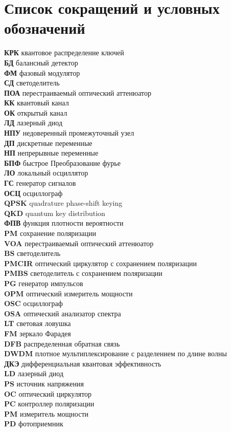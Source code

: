 \chapter*{Список сокращений и условных обозначений} %
\noindent
\textbf{КРК} квантовое распределение ключей \\
\textbf{БД} балансный детектор \\
\textbf{ФМ} фазовый модулятор\\
\textbf{СД} светоделитель\\
\textbf{ПОА} перестраиваемый оптический аттенюатор\\ 
\textbf{КК} квантовый канал\\ 
\textbf{ОК} открытый канал\\ 
\textbf{ЛД} лазерный диод\\ 
\textbf{НПУ} недоверенный промежуточный узел\\ 
\textbf{ДП} дискретные переменные\\ 
\textbf{НП} непрерывные переменные\\ 
\textbf{БПФ} быстрое Преобразование фурье\\ 
\textbf{ЛО} локальный осциллятор\\ 
\textbf{ГС} генератор сигналов\\ 
\textbf{ОСЦ} осциллограф\\ 
\textbf{QPSK} quadrature phase-shift keying\\ 
\textbf{QKD} quantum key distribution\\ 
\textbf{ФПВ} функция плотности вероятности\\ 
\textbf{PM} сохранение поляризации\\ 
\textbf{VOA} перестраиваемый оптический аттенюатор\\ 
\textbf{BS} светоделитель\\ 
\textbf{PMCIR} оптический циркулятор с сохранением поляризации\\ 
\textbf{PMBS} светоделитель с сохранением поляризации\\
\textbf{PG} генератор импульсов\\ 
\textbf{OPM} оптический измеритель мощности\\ 
\textbf{OSC} осциллограф\\ 
\textbf{OSA} оптический анализатор спектра\\ 
\textbf{LT} световая ловушка\\ 
\textbf{FM} зеркало Фарадея\\ 
\textbf{DFB} распределенная обратная связь\\ 
\textbf{DWDM} плотное мультиплексирование с разделением по длине волны\\ 
\textbf{ДКЭ} дифференциальная квантовая эффективность\\ 
\textbf{LD} лазерный диод\\ 
\textbf{PS} источник напряжения\\ 
\textbf{OC} оптический циркулятор\\ 
\textbf{PC} контроллер поляризации\\
\textbf{PM} измеритель мощности\\ 
\textbf{PD} фотоприемник\\ 